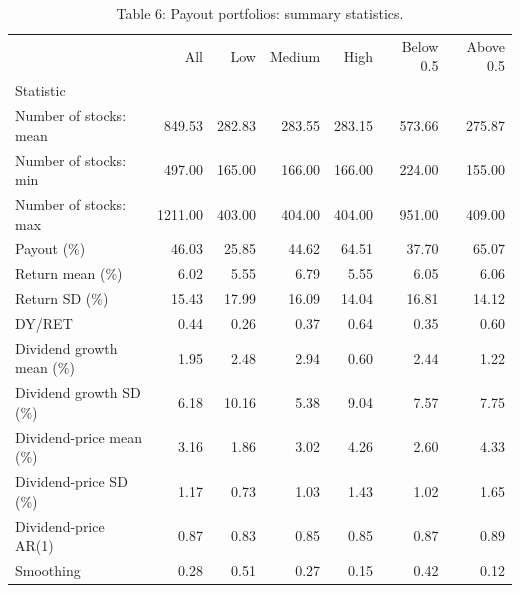 \begin{table}
\caption{Table 6: Payout portfolios: summary statistics.}
\label{tab:replication_6}
\begin{tabular}{lrrrrrr}
\toprule
 & All & Low & Medium & High & Below 0.5 & Above 0.5 \\
Statistic &  &  &  &  &  &  \\
\midrule
Number of stocks: mean & 849.53 & 282.83 & 283.55 & 283.15 & 573.66 & 275.87 \\
Number of stocks: min & 497.00 & 165.00 & 166.00 & 166.00 & 224.00 & 155.00 \\
Number of stocks: max & 1211.00 & 403.00 & 404.00 & 404.00 & 951.00 & 409.00 \\
Payout (\%) & 46.03 & 25.85 & 44.62 & 64.51 & 37.70 & 65.07 \\
Return mean (\%) & 6.02 & 5.55 & 6.79 & 5.55 & 6.05 & 6.06 \\
Return SD (\%) & 15.43 & 17.99 & 16.09 & 14.04 & 16.81 & 14.12 \\
DY/RET & 0.44 & 0.26 & 0.37 & 0.64 & 0.35 & 0.60 \\
Dividend growth mean (\%) & 1.95 & 2.48 & 2.94 & 0.60 & 2.44 & 1.22 \\
Dividend growth SD (\%) & 6.18 & 10.16 & 5.38 & 9.04 & 7.57 & 7.75 \\
Dividend-price mean (\%) & 3.16 & 1.86 & 3.02 & 4.26 & 2.60 & 4.33 \\
Dividend-price SD (\%) & 1.17 & 0.73 & 1.03 & 1.43 & 1.02 & 1.65 \\
Dividend-price AR(1) & 0.87 & 0.83 & 0.85 & 0.85 & 0.87 & 0.89 \\
Smoothing & 0.28 & 0.51 & 0.27 & 0.15 & 0.42 & 0.12 \\
\bottomrule
\end{tabular}
\end{table}
